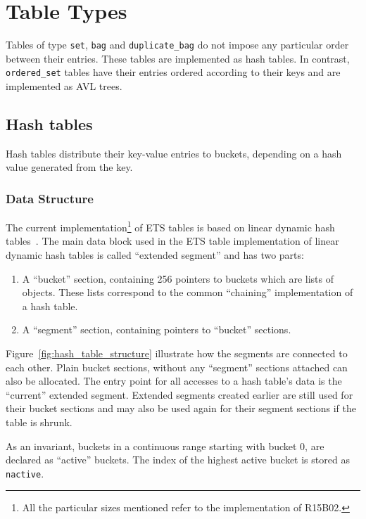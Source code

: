 \documentclass[aps,pre,preprint,nofootinbib]{revtex4}
\begin{document}
\section{Table Types} \label{sec:table_types}

Tables of type \verb|set|, \verb|bag| and \verb|duplicate_bag| do not impose any particular order between their entries.
These tables are implemented as hash tables.
In contrast, \verb|ordered_set| tables have their entries ordered according to their keys and are implemented as AVL trees.

\subsection{Hash tables}

Hash tables distribute their key-value entries to buckets, depending on a hash value generated from the key.

\subsubsection{Data Structure}

The current implementation\footnote{All the particular sizes mentioned refer to the implementation of R15B02.} of ETS tables is based on linear dynamic hash tables~\cite{Larson}.
The main data block used in the ETS table implementation of linear dynamic hash tables is called ``extended segment'' and has two parts:
\begin{enumerate}
\item A ``bucket'' section, containing 256 pointers to buckets which are lists of objects.
  These lists correspond to the common ``chaining'' implementation of a hash table.
\item A ``segment'' section, containing pointers to ``bucket'' sections.
\end{enumerate}
Figure~\ref{fig:hash_table_structure} illustrate how the segments are connected to each other. 
Plain bucket sections, without any ``segment'' sections attached can also be allocated.
The entry point for all accesses to a hash table's data is the ``current'' extended segment. 
Extended segments created earlier are still used for their bucket sections and may also be used again for their segment sections if the table is shrunk.

As an invariant, buckets in a continuous range starting with bucket 0, are declared as ``active'' buckets.
The index of the highest active bucket is stored as \verb|nactive|.
\end{document}
